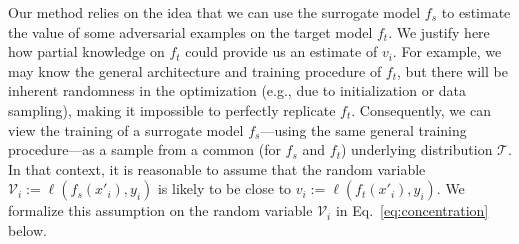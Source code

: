 Our method relies on the idea that we can use the surrogate model $f_s$ to estimate the value of some adversarial examples on the target model $f_t$. We justify here how partial knowledge on $f_t$ could provide us an estimate of $v_i$.
For example, we may know the general architecture and training procedure of $f_t$, but there will be inherent randomness in the optimization (e.g., due to initialization or data sampling), making it impossible to perfectly replicate $f_t$. 
Consequently, we can view the training of a surrogate model $f_s$---using the same general training procedure---as a sample from a common (for $f_s$ and $f_t$) underlying distribution $\mathcal T$. In that context, it is reasonable to assume that the random variable $\mathcal{V}_i := \ell(f_s(x'_i),y_i)$ is likely to be close to $v_i := \ell(f_t(x'_i),y_i)$. We formalize this assumption on the random variable $\mathcal{V}_i$ in Eq.~\ref{eq:concentration} below.


